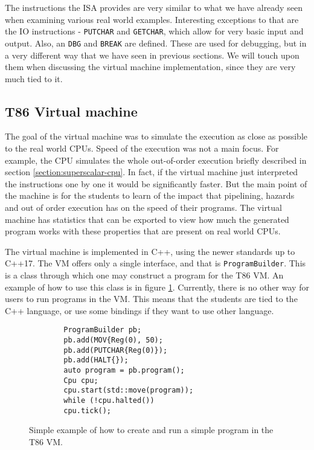 The instructions the ISA provides are very similar to what we have already seen
when examining various real world examples. Interesting exceptions to that are
the IO instructions - \texttt{PUTCHAR} and \texttt{GETCHAR}, which allow for
very basic input and output. Also, an \texttt{DBG} and \texttt{BREAK} are
defined. These are used for debugging, but in a very different way that we have
seen in previous sections. We will touch upon them when discussing the virtual
machine implementation, since they are very much tied to it.

\subsection{T86 Virtual machine}
The goal of the virtual machine was to simulate the execution as close as
possible to the real world CPUs. Speed of the execution was not a main focus.
For example, the CPU simulates the whole out-of-order execution briefly
described in section \ref{section:superscalar-cpu}. In fact, if the virtual
machine just interpreted the instructions one by one it would be significantly
faster. But the main point of the machine is for the students to learn of the
impact that pipelining, hazards and out of order execution has on the speed of
their programs. The virtual machine has statistics that can be exported to view
how much the generated program works with these properties that are present on
real world CPUs.

The virtual machine is implemented in C++, using the newer standards up to
C++17. The VM offers only a single interface, and that is
\texttt{ProgramBuilder}. This is a class through which one may construct a
program for the T86 VM. An example of how to use this class is in figure
\ref{fig:t86-intro}. Currently, there is no other way for users to run programs
in the VM. This means that the students are tied to the C++ language, or use
some bindings if they want to use other language.

\begin{figure}
    \begin{verbatim}
        ProgramBuilder pb;
        pb.add(MOV{Reg(0), 50);
        pb.add(PUTCHAR{Reg(0)});
        pb.add(HALT{});
        auto program = pb.program();
        Cpu cpu;
        cpu.start(std::move(program));
        while (!cpu.halted())
        cpu.tick();
    \end{verbatim}
    \caption{Simple example of how to create and run a simple program in the T86 VM.}
    \label{fig:t86-intro}
\end{figure}

